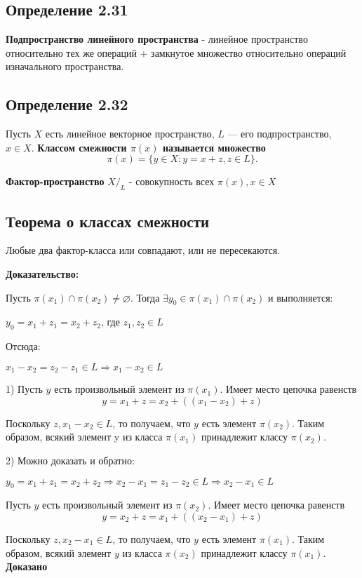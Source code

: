 \documentclass[12pt, english]{article}
\begin{document}
\subsection*{Определение 2.31}
	\textbf{Подпространство линейного пространства} - линейное пространство относительно тех же операций + замкнутое множество относительно операций изначального пространства.
	
\subsection*{Определение 2.32}	\label{eq102}
	Пусть $X$ есть линейное векторное пространство, $L$ — его подпространство, $x \in X$. \textbf{Классом смежности $\pi(x)$ называется множество} 
	$$\pi(x) = \{ y \in X : y = x + z, z \in L \}.$$
	
	\textbf{Фактор-пространство} $X\text{/}_L$ - совокупность всех $\pi(x), x \in X$
	
\subsection{Теорема о классах смежности}
		
	Любые два фактор-класса или совпадают, или не пересекаются.
	
\textbf{Доказательство:}

	Пусть $\pi(x_1) \cap \pi(x_2) \neq \varnothing$.
	Тогда $\exists y_0 \in \pi(x_1) \cap \pi(x_2)$ и выполняется:
 	
 	$y_0 = x_1 + z_1 = x_2 + z_2$, где $z_1, z_2 \in L$
 	
 	Отсюда:
 	
 	$x_1 - x_2 = z_2 - z_1 \in L	 \Rightarrow x_1 - x_2 \in L$
	
	 1) Пусть $y$ есть произвольный элемент из $\pi(x_1)$. Имеет место цепочка равенств
	  $$y = x_1 + z = x_2 + ((x_1 - x_2) + z) $$

Поскольку $z, x_1 - x_2 \in L$, то получаем, что $y$ есть элемент $\pi(x_2)$. 
Таким образом, всякий элемент y из класса $\pi(x_1)$ принадлежит классу $\pi(x_2)$.

	2) Можно доказать и обратно:

	$y_0 = x_1 + z_1 = x_2 + z_2 \Rightarrow x_2 - x_1 = z_1 - z_2 \in L	\Rightarrow x_2 - x_1 \in L$
	
		 Пусть $y$ есть произвольный элемент из $\pi(x_2)$. Имеет место цепочка равенств
	  $$y = x_2 + z = x_1 + ((x_2 - x_1) + z) $$
	
Поскольку $z, x_2 - x_1 \in L$, то получаем, что $y$ есть элемент $\pi(x_1)$. 
Таким образом, всякий элемент $y$ из класса $\pi(x_2)$ принадлежит классу $\pi(x_1)$.	
	\textbf{Доказано}
	
\end{document}
